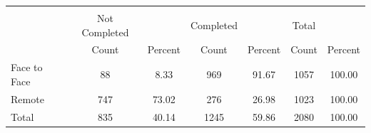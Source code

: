 {
\def\sym#1{\ifmmode^{#1}\else\(^{#1}\)\fi}
\begin{tabular}{l*{3}{cc}}
\hline\hline
            &\multicolumn{6}{c}{}                                                                           \\
            &  Not Completed&               &      Completed&               &          Total&               \\
            &          Count&        Percent&          Count&        Percent&          Count&        Percent\\
\hline
Face to Face&             88&           8.33&            969&          91.67&           1057&         100.00\\
Remote      &            747&          73.02&            276&          26.98&           1023&         100.00\\
Total       &            835&          40.14&           1245&          59.86&           2080&         100.00\\
\hline\hline
\end{tabular}
}
